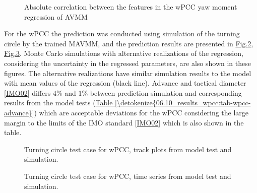\documentclass[review]{elsarticle}
\begin{document}
\begin{figure}[H]
\centering
\capstart

\noindent{}
\caption{Absolute correlation between the features in the wPCC yaw moment regression of AVMM}\label{\detokenize{06.10_results_wpcc:fig-ncorr}}\end{figure}

\sphinxAtStartPar
For the wPCC the prediction was conducted using simulation of the turning circle by the trained MAVMM, and the prediction results are presented in \hyperref[\detokenize{06.10_results_wpcc:fig-track-plot-testing-sim}]{Fig.\@ \ref{\detokenize{06.10_results_wpcc:fig-track-plot-testing-sim}}}, \hyperref[\detokenize{06.10_results_wpcc:fig-testing-sim}]{Fig.\@ \ref{\detokenize{06.10_results_wpcc:fig-testing-sim}}}. Monte Carlo simulations with alternative realizations of the regression, considering the uncertainty in the regressed parameters, are also shown in these figures. The alternative realizations have similar simulation results to the model with mean values of the regression (black line). 
Advance and tactical diameter {[}\hyperlink{cite.bibligraphy:id16}{IMO02}{]} differs 4\% and 1\% between prediction simulation and corresponding results from the model tests (\hyperref[\detokenize{06.10_results_wpcc:tab-wpcc-advance}]{Table \ref{\detokenize{06.10_results_wpcc:tab-wpcc-advance}}})
which are acceptable deviations for the wPCC considering the large margin to the limits of the IMO standard {[}\hyperlink{cite.bibligraphy:id16}{IMO02}{]} which is also shown in the table.

\begin{figure}[H]
\centering
\capstart

\noindent{}
\caption{Turning circle test case for wPCC, track plots from model test and simulation.}\label{\detokenize{06.10_results_wpcc:fig-track-plot-testing-sim}}\end{figure}

\begin{figure}[H]
\centering
\capstart

\noindent{}
\caption{Turning circle test case for wPCC, time series from model test and simulation.}\label{\detokenize{06.10_results_wpcc:fig-testing-sim}}\end{figure}
\end{document}
